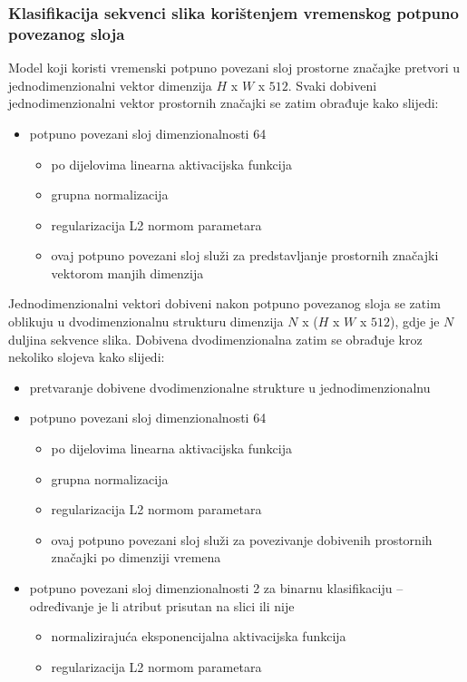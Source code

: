 \documentclass[times, utf8, diplomski, numeric]{fer}
\begin{document}
\subsubsection{Klasifikacija sekvenci slika korištenjem vremenskog potpuno povezanog sloja}
Model koji koristi vremenski potpuno povezani sloj prostorne značajke pretvori u jednodimenzionalni vektor dimenzija $H$ x $W$ x $512$.
Svaki dobiveni jednodimenzionalni vektor prostornih značajki se zatim obrađuje kako slijedi:
\begin{itemize}
  \item potpuno povezani sloj dimenzionalnosti 64
 \begin{itemize}
  \item po dijelovima linearna  aktivacijska funkcija
  \item grupna normalizacija 
  \item regularizacija L2 normom parametara
  \item ovaj potpuno povezani sloj služi za predstavljanje prostornih značajki vektorom manjih dimenzija
 \end{itemize}
\end{itemize}
Jednodimenzionalni vektori dobiveni nakon potpuno povezanog sloja se zatim oblikuju u dvodimenzionalnu strukturu dimenzija $N$ x ($H$ x $W$ x $512$), gdje je $N$ duljina sekvence slika.
Dobivena dvodimenzionalna zatim se obrađuje kroz nekoliko slojeva kako slijedi:
\begin{itemize}
 \item pretvaranje dobivene dvodimenzionalne strukture u jednodimenzionalnu
 \item potpuno povezani sloj dimenzionalnosti 64
 \begin{itemize}
  \item po dijelovima linearna  aktivacijska funkcija
  \item grupna normalizacija 
  \item regularizacija L2 normom parametara
  \item ovaj potpuno povezani sloj služi za povezivanje dobivenih prostornih značajki po dimenziji vremena
 \end{itemize}
 \item potpuno povezani sloj dimenzionalnosti 2 za binarnu klasifikaciju -- određivanje je li atribut prisutan na slici ili nije
 \begin{itemize}
  \item normalizirajuća eksponencijalna  aktivacijska funkcija
  \item regularizacija L2 normom parametara
 \end{itemize}
\end{itemize}
\end{document}

